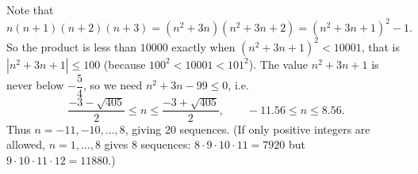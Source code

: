 Note that
\[n(n+1)(n+2)(n+3)=(n^2+3n)(n^2+3n+2)=(n^2+3n+1)^2-1.\]
So the product is less than $10000$ exactly when $(n^2+3n+1)^2<10001$, that is $|n^2+3n+1|\le100$ (because $100^2<10001<101^2$). The value $n^2+3n+1$ is never below $-\dfrac{5}{4}$, so we need $n^2+3n-99\le0$, i.e.
\[\dfrac{-3-\sqrt{405}}{2}\le n\le\dfrac{-3+\sqrt{405}}{2},\qquad -11.56\le n\le 8.56.\]
Thus $n=-11,-10,\dots,8$, giving $\boxed{20}$ sequences. (If only positive integers are allowed, $n=1,\dots,8$ gives $8$ sequences: $8\cdot9\cdot10\cdot11=7920$ but $9\cdot10\cdot11\cdot12=11880$.)
